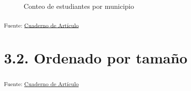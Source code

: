 \documentclass[
  12pt]{article}
\begin{document}
\begin{figure}[H]


\caption{\label{fig-mun2024cant}Conteo de estudiantes por municipio}

\end{figure}%

\textsubscript{Fuente: \href{sociest.org/index.ipynb.html}{Cuaderno de
Artículo}}

\section{3.2. Ordenado por tamaño}\label{ordenado-por-tamauxf1o}

\textsubscript{Fuente: \href{sociest.org/index.ipynb.html}{Cuaderno de
Artículo}}
\end{document}
